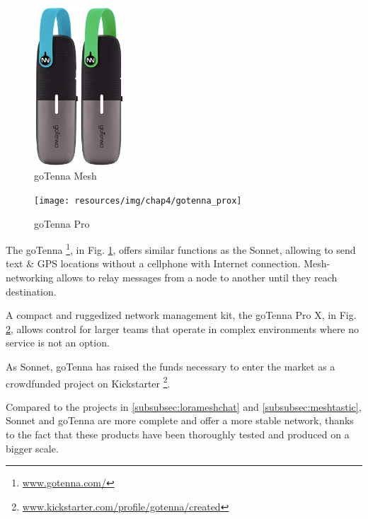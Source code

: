 				\begin{minipage}{0.5\textwidth}%
					\begin{figure}[H]
						\centering
						\includegraphics[height=6cm]{resources/img/chap4/gotenna}
						\caption{goTenna Mesh}
						\label{img:gotenna}
					\end{figure}
				\end{minipage}%
				\hfill%
				\begin{minipage}{0.5\textwidth}\raggedright
					\begin{figure}[H]
						\centering
						\texttt{[image: resources/img/chap4/gotenna\_prox]}
						\caption{goTenna Pro}
						\label{img:gotenna_pro}
					\end{figure}
				\end{minipage}%
				\newline
				
				The goTenna \footnote{ \url{www.gotenna.com/}}, in Fig. \ref{img:gotenna}, offers similar functions as the Sonnet, allowing to send text \& GPS locations without a cellphone with Internet connection.
				Mesh-networking allows to relay messages from a node to another until they reach destination.
				
				A compact and ruggedized network management kit, the goTenna Pro X, in Fig. \ref{img:gotenna_pro}, allows control for larger teams that operate in complex environments where no service is not an option.
						
				As Sonnet, goTenna has raised the funds necessary to enter the market as a crowdfunded project on Kickstarter \footnote{\url{www.kickstarter.com/profile/gotenna/created}}.
				
				Compared to the projects in \ref{subsubsec:lorameshchat} and \ref{subsubsec:meshtastic}, Sonnet and goTenna are more complete and offer a more stable network, thanks to the fact that these products have been thoroughly tested and produced on a bigger scale.
						
